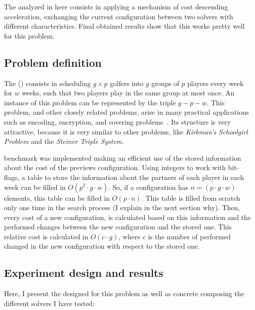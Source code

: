  The \commstr{} analyzed in here consists in applying a mechanism of cost descending acceleration, exchanging the current configuration between two solvers with different characteristics. Final obtained results show that this \commstr{} works pretty well for this problem.

\subsection{Problem definition}

The \sgp{} (\SGP) consists in scheduling $g\times p$ golfers into $g$ groups of $p$ players every week for $w$ weeks, such that two players play in the same group at most once. An instance of this problem can be represented by the triple $g-p-w$. This problem, and other closely related problems, arise in many practical applications such as encoding, encryption, and covering problems~\cite{Lardeux2014}. Its structure is very attractive, because it is very similar to other problems, like \textit{Kirkman's Schoolgirl Problem} and the \textit{Steiner Triple System}. %

 benchmark was implemented making an efficient use of the stored information about the cost of the previews configuration. Using integers to work with bit-flags, a table to store the information about the partners of each player in each week can be filled in $O\left(p^2\cdot g \cdot w\right)$. So, if a configuration has $n = (p\cdot g \cdot w)$ elements, this table can be filled in $O\left(p\cdot n\right)$. This table is filled from scratch only one time in the search process (I explain in the next section why). Then, every cost of a new configuration, is calculated based on this information and the performed changes between the new configuration and the stored one. This relative cost is calculated in $O\left(c\cdot g\right)$, where $c$ is the number of performed changed in the new configuration with respect to the stored one.

\subsection{Experiment design and results}

Here, I present the \as{} designed for this problem as well as concrete \oms{} composing the different solvers I have tested:

